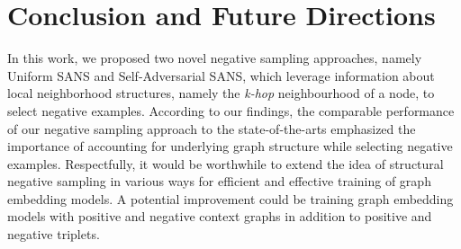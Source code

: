 \section{Conclusion and Future Directions}
\label{sec:conclusion}

In this work, we proposed two novel negative sampling approaches, namely Uniform SANS and Self-Adversarial SANS, which leverage information about local neighborhood structures, namely the \emph{k-hop} neighbourhood of a node, to select negative examples. According to our findings, the comparable performance of our negative sampling approach to the state-of-the-arts emphasized the importance of accounting for underlying graph structure while selecting negative examples. Respectfully, it would be worthwhile to extend the idea of structural negative sampling in various ways for efficient and effective training of graph embedding models. A potential improvement could be training graph embedding models with positive and negative context graphs \cite{navarin2018pre} in addition to positive and negative triplets.






